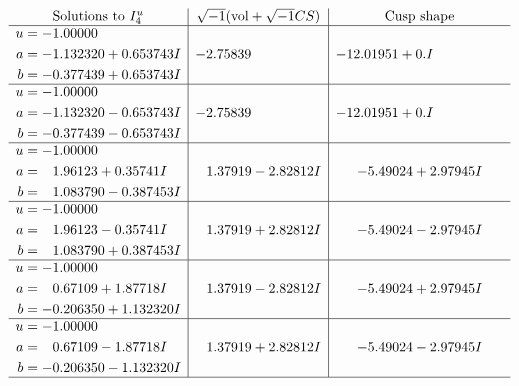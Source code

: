 \documentclass[1p]{elsarticle_modified}
\theoremstyle{definition}
\newcommand{\I}{\sqrt{-1}}
\begin{document}
$$\begin{array}{c|c|c}  
\text{Solutions to }I^u_{4}& \I (\text{vol} + \sqrt{-1}CS) & \text{Cusp shape}\\
 \hline 
\begin{aligned}
u &= -1.00000\phantom{ +0.000000I} \\
a &= -1.132320 + 0.653743 I \\
b &= -0.377439 + 0.653743 I\end{aligned}
 & -2.75839\phantom{ +0.000000I} & -12.01951 + 0. I\phantom{ +0.000000I} \\ \hline\begin{aligned}
u &= -1.00000\phantom{ +0.000000I} \\
a &= -1.132320 - 0.653743 I \\
b &= -0.377439 - 0.653743 I\end{aligned}
 & -2.75839\phantom{ +0.000000I} & -12.01951 + 0. I\phantom{ +0.000000I} \\ \hline\begin{aligned}
u &= -1.00000\phantom{ +0.000000I} \\
a &= \phantom{-}1.96123 + 0.35741 I \\
b &= \phantom{-}1.083790 - 0.387453 I\end{aligned}
 & \phantom{-}1.37919 - 2.82812 I & -5.49024 + 2.97945 I \\ \hline\begin{aligned}
u &= -1.00000\phantom{ +0.000000I} \\
a &= \phantom{-}1.96123 - 0.35741 I \\
b &= \phantom{-}1.083790 + 0.387453 I\end{aligned}
 & \phantom{-}1.37919 + 2.82812 I & -5.49024 - 2.97945 I \\ \hline\begin{aligned}
u &= -1.00000\phantom{ +0.000000I} \\
a &= \phantom{-}0.67109 + 1.87718 I \\
b &= -0.206350 + 1.132320 I\end{aligned}
 & \phantom{-}1.37919 - 2.82812 I & -5.49024 + 2.97945 I \\ \hline\begin{aligned}
u &= -1.00000\phantom{ +0.000000I} \\
a &= \phantom{-}0.67109 - 1.87718 I \\
b &= -0.206350 - 1.132320 I\end{aligned}
 & \phantom{-}1.37919 + 2.82812 I & -5.49024 - 2.97945 I\\
 \hline 
 \end{array}$$\newpage
\end{document}
